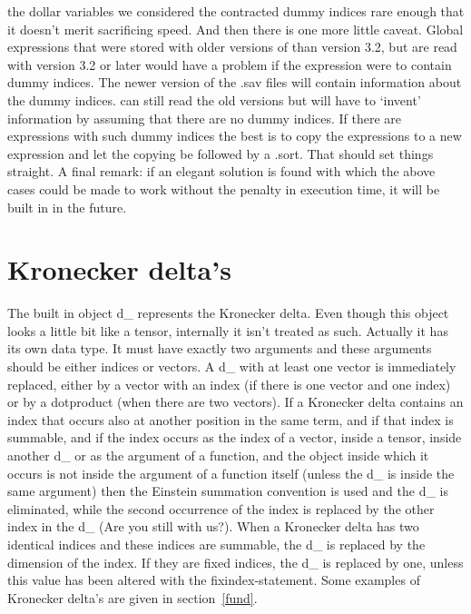 the dollar variables we considered the contracted dummy indices rare enough 
that it doesn't merit sacrificing speed. And then there is one more little 
caveat. Global expressions that were stored with older 
versions of {\FORM} than version 3.2, but are read with version 3.2 or later 
would have a problem if the expression were to contain dummy indices. The 
newer version of the .sav files will contain information 
about the dummy indices. {\FORM} can still read the old versions but will 
have to `invent' information by assuming that there are no dummy indices. 
If there are expressions with such dummy indices the best is to copy the 
expressions to a new expression and let the copying be followed by a .sort. 
That should set things straight. A final remark: if an elegant solution is 
found with which the above cases could be made to work without the penalty 
in execution time, it will be built in in the future.

\section{Kronecker delta's}

\label{sect-kroneckerdelta}
The built in object d\_ represents the Kronecker 
delta. Even though this 
object looks a little bit like a tensor, internally it isn't treated as 
such. Actually it has its own data type. It must have exactly two arguments 
and these arguments should be either indices or vectors. A d\_ with at 
least one vector is immediately replaced, either by a vector with an index 
(if there is one vector and one index) or by a dotproduct (when there are 
two vectors). If a Kronecker delta contains an index that occurs also at 
another position in the same term, and if that index is summable, and if 
the index occurs as the index of a vector, inside a tensor, inside another 
d\_ or as the argument of a function, and the object inside which it occurs 
is not inside the argument of a function itself (unless the d\_ is inside 
the same argument) then the Einstein 
summation convention is used and the 
d\_ is eliminated, while the second occurrence of the index is replaced by 
the other index in the d\_ (Are you still with us?). When a 
Kronecker delta has two identical indices and these indices are summable, 
the d\_ is replaced by the dimension of the index. If they are fixed 
indices, the d\_ is replaced by one, unless this value has been altered 
with the fixindex-statement. Some examples of Kronecker delta's are given 
in section~\ref{fund}.


